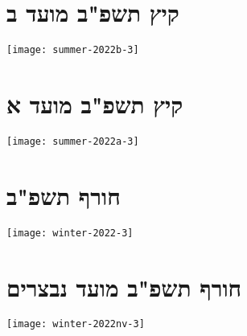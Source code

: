 

\section{קיץ תשפ"ב מועד ב}

\begin{center}
\texttt{[image: summer-2022b-3]}
\end{center}


\section{קיץ תשפ"ב מועד א}

\begin{center}
\texttt{[image: summer-2022a-3]}
\end{center}


\section{חורף תשפ"ב}

\begin{center}
\texttt{[image: winter-2022-3]}
\end{center}


\section{חורף תשפ"ב מועד נבצרים}

\begin{center}
\texttt{[image: winter-2022nv-3]}
\end{center}
